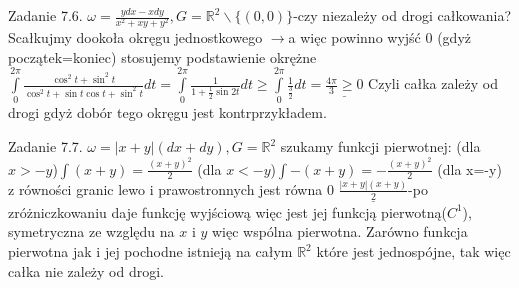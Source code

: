 \documentclass{article}
\begin{document}
Zadanie 7.6.
\newline
\newline
$
\omega=\frac{ydx-xdy}{x^2+xy+y^2}, G=\mathbb{R}^2\backslash\{(0,0)\}
$-czy niezależy od drogi całkowania?\quad Scałkujmy dookoła okręgu jednostkowego $\rightarrow$a więc powinno wyjść 0 (gdyż początek=koniec)\newline
stosujemy podstawienie okrężne
$
\int\limits_{0}^{2\pi}\frac{\cos^2{t}+\sin^2{t}}{\cos^2{t}+\sin{t}\cos{t}+\sin^2{t}}dt
=
\int\limits_{0}^{2\pi}\frac{1}{1+\frac{1}{2}\sin{2t}}dt
\ge
\int\limits_{0}^{2\pi}\frac{1}{\frac{3}{2}}dt
=
\underline{\frac{4\pi}{3}\ge 0}
$
Czyli całka zależy od drogi gdyż dobór tego okręgu jest kontrprzykładem.
\newline
\newline

Zadanie 7.7.
\newline
\newline
$
\omega=|x+y|(dx+dy), G=\mathbb{R}^2
$\newline
szukamy funkcji pierwotnej:
(dla $x>-y$)$\int(x+y)=\frac{(x+y)^2}{2}$
(dla $x<-y$)$\int-(x+y)=-\frac{(x+y)^2}{2}$
(dla x=-y) z równości granic lewo i prawostronnych jest równa 0\newline
$\underline{\frac{|x+y|(x+y)}{2}}$-po zróżniczkowaniu daje funkcję wyjściową więc jest jej funkcją pierwotną($C^1$), symetryczna ze względu na $x$ i $y$ więc wspólna pierwotna.
Zarówno funkcja pierwotna jak i jej pochodne istnieją na całym $\mathbb{R}^2$ które jest jednospójne, tak więc całka nie zależy od drogi.
\newline
\newline
\end{document}
